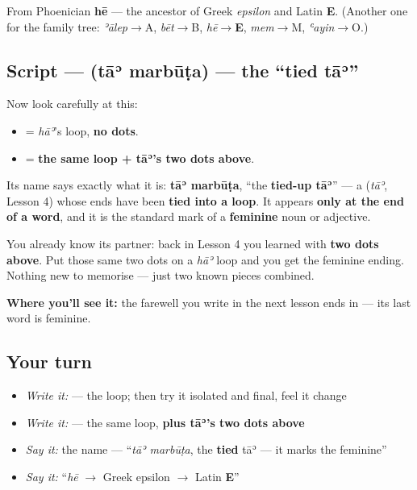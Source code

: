 From Phoenician \textbf{hē} — the ancestor of Greek \emph{epsilon} and Latin \textbf{E}. (Another one for the family tree: \emph{ʾālep}$\to$A, \emph{bēt}$\to$B, \emph{hē}$\to$\textbf{E}, \emph{mem}$\to$M, \emph{ʿayin}$\to$O.)

\subsection*{Script —  (tāʾ marbūṭa) — the \textquotedblleft{}tied tāʾ\textquotedblright{}}
Now look carefully at this:

\begin{itemize}
\raggedright
  \item \textbf{} = \emph{hāʾ}'s loop, \textbf{no dots}.
  \item \textbf{} = \textbf{the same loop + tāʾ's two dots above}.
\end{itemize}

Its name says exactly what it is: \textbf{tāʾ marbūṭa}, \textquotedblleft{}the \textbf{tied-up tāʾ}\textquotedblright{} — a \textbf{} (\emph{tāʾ}, Lesson 4) whose ends have been \textbf{tied into a loop}. It appears \textbf{only at the end of a word}, and it is the standard mark of a \textbf{feminine} noun or adjective.

You already know its partner: back in Lesson 4 you learned \textbf{} with \textbf{two dots above}. Put those same two dots on a \emph{hāʾ} loop and you get the feminine ending. Nothing new to memorise — just two known pieces combined.

\textbf{Where you'll see it:} the farewell you write in the next lesson ends in \textbf{} — its last word is feminine.

\subsection*{Your turn}
\begin{itemize}
\raggedright
  \item \emph{Write it:} \textbf{} — the loop; then try it isolated and final, feel it change
  \item \emph{Write it:} \textbf{} — the same loop, \textbf{plus tāʾ's two dots above}
  \item \emph{Say it:} the name — \textquotedblleft{}\emph{tāʾ marbūṭa}, the \textbf{tied} tāʾ — it marks the feminine\textquotedblright{}
  \item \emph{Say it:} \textquotedblleft{}\emph{hē} $\to$ Greek epsilon $\to$ Latin \textbf{E}\textquotedblright{}
\end{itemize}

